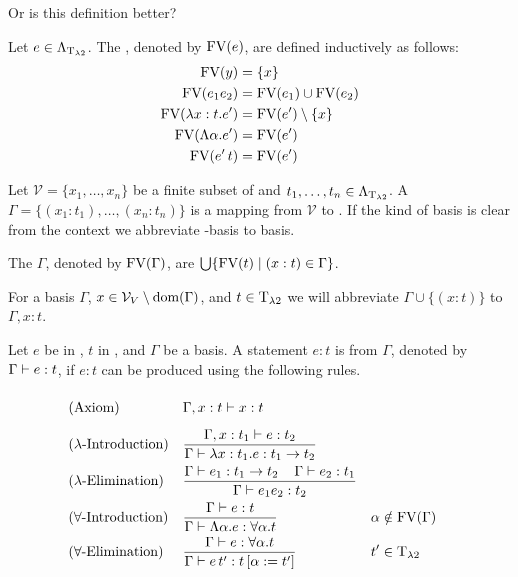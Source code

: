 Or is this definition better?
\begin{definition}
	Let $e\in\Lambda_{\text{T}_{\lambda2}}$. The , denoted by $\text{FV}(e)$, are defined inductively as follows:
	\begin{align*}
		\text{FV}(y)                & =\{x\}                 \\
		\text{FV}(e_1e_2)           & =\text{FV}(e_1)\cup\text{FV}(e_2)  \\
		\text{FV}(\lambda x:t.e')   & =\text{FV}(e')\setminus\{x\} \\
		\text{FV}(\Lambda\alpha.e') & =\text{FV}(e')               \\
		\text{FV}(e'\,t)            & =\text{FV}(e')               \\
	\end{align*}
\end{definition}
\begin{definition} Let $\mathcal{V}=\{x_1,\dots,x_n\}$ be a finite subset of \lambdaTypVar{} and $t_1,\dots,t_n\in\Lambda_{\text{T}_{\lambda2}}$.	A  $\Gamma=\{(x_1:t_1),\dots,(x_n:t_n)\}$ is a mapping from $\mathcal{V}$ to \lambdaTypes{}. If the kind of basis is clear from the context we abbreviate \lambdaTwo-basis to basis. 

The  $\Gamma$, denoted by $\text{FV}(\Gamma)$, are $\bigcup\{\text{FV}(t)\mid(x:t)\in\Gamma\}$.
\end{definition}

For a basis $\Gamma$, $x\in\mathcal{V}_V\setminus\text{dom}(\Gamma)$, and $t\in\text{T}_{\lambda2}$ we will abbreviate $\Gamma\cup\{(x:t)\}$ to $\Gamma,x:t$.

\begin{definition}
Let $e$ be in \lambdaTerms{}, $t$ in \lambdaTypes, and $\Gamma$ be a basis. A statement $e:t$ is  from $\Gamma$, denoted by $\Gamma\vdash e:t$, if $e:t$ can be produced using the following rules.
\begin{mdframed} 
	\begingroup
	\addtolength{\jot}{0.3cm}
	\begin{align*}
		&(\text{Axiom}) &&\Gamma,x:t\lambdaModels x:t\vphantom{\frac{t_1}{t_1}}\\
		&(\lambda\text{-Introduction}) &&\frac{\Gamma,x:t_1\lambdaModels e:t_2}{\Gamma\lambdaModels \lambda x:t_1.e:t_1\to t_2}\\
		&(\lambda\text{-Elimination}) &&\frac{\Gamma\lambdaModels e_1:t_1\to t_2 \hspace{0.4cm}\Gamma\lambdaModels e_2:t_1}{\Gamma\lambdaModels e_1e_2:t_2}\\
& (\forall\text{-Introduction}) &   & \frac{\Gamma\lambdaModels e:t}{\Gamma\lambdaModels \Lambda\alpha.e:\forall\alpha.t}                 &   & \alpha\notin\FV(\Gamma) \\
& (\forall\text{-Elimination})  &   & \frac{\Gamma\lambdaModels e:\forall\alpha.t }{\Gamma\lambdaModels e\,t':t\left[ \alpha:=t'\right] } &   & t'\in\lambdaTypes %
	\end{align*}
	\endgroup
\end{mdframed}
\end{definition}


